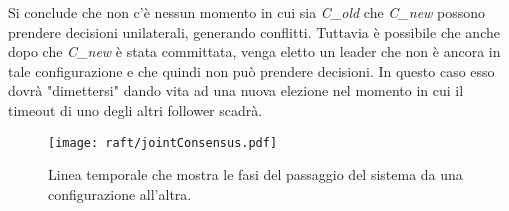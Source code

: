     Si conclude che non c'è nessun momento in cui sia \textit{C\_old} che \textit{C\_new} possono prendere decisioni unilaterali, generando conflitti.
    Tuttavia è possibile che anche dopo che \textit{C\_new} è stata committata, venga eletto un leader che non è ancora in tale configurazione e che quindi non può prendere decisioni. In questo caso esso dovrà "dimettersi" dando vita ad una nuova elezione nel momento in cui il timeout di uno degli altri follower scadrà.


  \begin{figure}[H]
    \centering
    \texttt{[image: raft/jointConsensus.pdf]}
    \caption{Linea temporale che mostra le fasi del passaggio del sistema da una configurazione all'altra.}
    \label{fig:figure 9}
  \end{figure}

